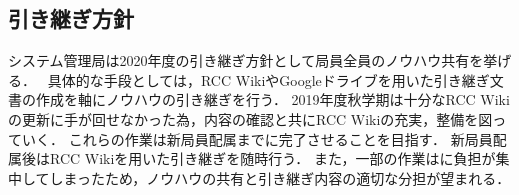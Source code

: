 \subsection*{引き継ぎ方針}

システム管理局は2020年度の引き継ぎ方針として局員全員のノウハウ共有を挙げる．　
具体的な手段としては，RCC WikiやGoogleドライブを用いた引き継ぎ文書の作成を軸にノウハウの引き継ぎを行う．
2019年度秋学期は十分なRCC Wikiの更新に手が回せなかった為，内容の確認と共にRCC Wikiの充実，整備を図っていく．
これらの作業は新局員配属までに完了させることを目指す．
新局員配属後はRCC Wikiを用いた引き継ぎを随時行う．
また，一部の作業は\thirdGrade{}に負担が集中してしまったため，ノウハウの共有と引き継ぎ内容の適切な分担が望まれる．